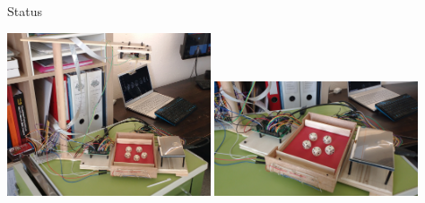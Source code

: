 \documentclass{beamer}
\begin{document}
\begin{frame}{Status}

\begin{center}
    \includegraphics[width=0.45\textwidth]{fig_kniffelbot_1}
    \includegraphics[width=0.45\textwidth]{fig_kniffelbot_2}
\end{center}

\end{frame}
\end{document}
